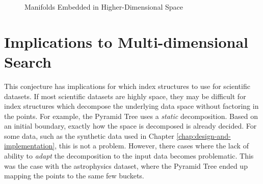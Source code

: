 \begin{figure}
	\caption{Manifolds Embedded in Higher-Dimensional Space}
	\label{fig:manifolds}
\end{figure}

\section{Implications to Multi-dimensional Search}
\label{sec:implications-to-md-search}

This conjecture has implications for which index structures to use for scientific datasets. If most scientific datasets are highly space, they may be difficult for index structures which decompose the underlying data space without factoring in the points. For example, the Pyramid Tree uses a \textit{static} decomposition. Based on an initial boundary, exactly how the space is decomposed is already decided. For some data, such as the synthetic data used in Chapter \ref{chap:design-and-implementation}, this is not a problem. However, there cases where the lack of ability to \textit{adapt} the decomposition to the input data becomes problematic. This was the case with the astrophysics dataset, where the Pyramid Tree ended up mapping the points to the same few buckets.

